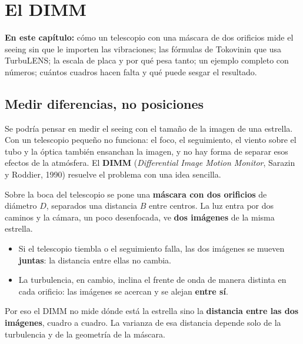 \chapter{El DIMM}\label{cap:dimm}

\begin{resumen}
\textbf{En este capítulo:} cómo un telescopio con una máscara de dos orificios mide el seeing sin que le importen las
vibraciones; las fórmulas de Tokovinin que usa TurbuLENS; la escala de placa y por qué pesa tanto; un ejemplo completo
con números; cuántos cuadros hacen falta y qué puede sesgar el resultado.
\end{resumen}

\section{Medir diferencias, no posiciones}\label{sec:principio}

Se podría pensar en medir el seeing con el tamaño de la imagen de una estrella. Con un telescopio pequeño no funciona: el
foco, el seguimiento, el viento sobre el tubo y la óptica también ensanchan la imagen, y no hay forma de separar esos
efectos de la atmósfera. El \textbf{DIMM} (\emph{Differential Image Motion Monitor}, Sarazin y Roddier, 1990) resuelve el
problema con una idea sencilla.

Sobre la boca del telescopio se pone una \textbf{máscara con dos orificios} de diámetro $D$, separados una distancia $B$
entre centros. La luz entra por dos caminos y la cámara, un poco desenfocada, ve \textbf{dos imágenes} de la misma estrella.
\begin{itemize}
\item Si el telescopio tiembla o el seguimiento falla, las dos imágenes se mueven \textbf{juntas}: la distancia entre
ellas no cambia.
\item La turbulencia, en cambio, inclina el frente de onda de manera distinta en cada orificio: las imágenes se acercan
y se alejan \textbf{entre sí}.
\end{itemize}
Por eso el DIMM no mide dónde está la estrella sino la \textbf{distancia entre las dos imágenes}, cuadro a cuadro. La
varianza de esa distancia depende solo de la turbulencia y de la geometría de la máscara.

